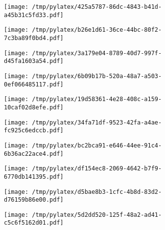 \documentclass{article}
\begin{document}
\begin{figure}[htbp]
\begin{subfigure}[b]{.3\linewidth}
\texttt{[image: /tmp/pylatex/425a5787-86dc-4843-b41d-a45b31c5fd33.pdf]}
\end{subfigure}
\begin{subfigure}[b]{.3\linewidth}
\texttt{[image: /tmp/pylatex/b26e1d61-36ce-44bc-80f2-7c3ba89f0bd4.pdf]}
\end{subfigure}
\begin{subfigure}[b]{.3\linewidth}
\texttt{[image: /tmp/pylatex/3a179e04-8789-40d7-997f-d45fa1603a54.pdf]}
\end{subfigure}
\begin{subfigure}[b]{.3\linewidth}
\texttt{[image: /tmp/pylatex/6b09b17b-520a-48a7-a503-0ef066485117.pdf]}
\end{subfigure}
\begin{subfigure}[b]{.3\linewidth}
\texttt{[image: /tmp/pylatex/19d58361-4e28-408c-a159-10caf02d8efe.pdf]}
\end{subfigure}
\begin{subfigure}[b]{.3\linewidth}
\texttt{[image: /tmp/pylatex/34fa71df-9523-42fa-a4ae-fc925c6edccb.pdf]}
\end{subfigure}
\begin{subfigure}[b]{.3\linewidth}
\texttt{[image: /tmp/pylatex/bc2bca91-e646-44ee-91c4-6b36ac22ace4.pdf]}
\end{subfigure}
\begin{subfigure}[b]{.3\linewidth}
\texttt{[image: /tmp/pylatex/df154ec8-2069-4642-b7f9-6770db141395.pdf]}
\end{subfigure}
\begin{subfigure}[b]{.3\linewidth}
\texttt{[image: /tmp/pylatex/d5bae8b3-1cfc-4b8d-83d2-d76159b86e00.pdf]}
\end{subfigure}
\begin{subfigure}[b]{.3\linewidth}
\texttt{[image: /tmp/pylatex/5d2dd520-125f-48a2-ad41-c5c6f5162d01.pdf]}
\end{subfigure}
\end{figure}
\end{document}

